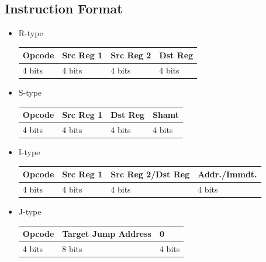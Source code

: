 \documentclass[12pt]{article}
\begin{document}
\subsection{Instruction Format}
\begin{itemize}
    \item R-type \hspace{10}
        \begin{tabular}{|p{2cm}|p{2cm}|p{4cm}|p{2.5cm}|}
        \hline
         Opcode & Src Reg 1 & Src Reg 2 & Dst Reg  \\
         \hline
         4 bits & 4 bits & 4 bits & 4 bits \\
         \hline
        \end{tabular}
    \item S-type \hspace{12}
        \begin{tabular}{|p{2cm}|p{2cm}|p{4cm}|p{2.5cm}|}
        \hline
        Opcode & Src Reg 1 & Dst Reg & Shamt  \\
        \hline
        4 bits & 4 bits & 4 bits & 4 bits \\
        \hline
        \end{tabular}
    \item I-type \hspace{14}
        \begin{tabular}{|p{2cm}|p{2cm}|p{4cm}|p{2.5cm}|}
        \hline
         Opcode & Src Reg 1 & Src Reg 2/Dst Reg & Addr./Immdt.  \\
         \hline
         4 bits & 4 bits & 4 bits & 4 bits \\
         \hline
    \end{tabular}
    \item J-type \hspace{13}
        \begin{tabular}{|p{2cm}|p{6.4cm}|p{2.5cm}|}
        \hline
         Opcode & Target Jump Address & 0  \\
         \hline
         4 bits & 8 bits & 4 bits \\
         \hline
    \end{tabular}
\end{itemize}


\newpage
\end{document}
